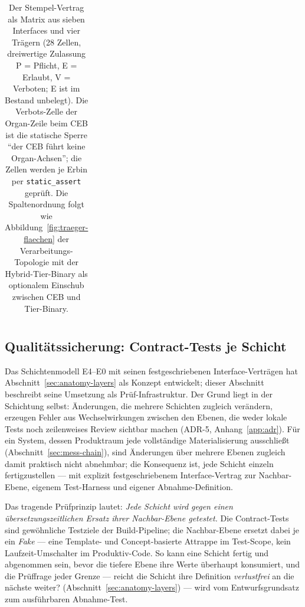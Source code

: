 \begin{nurkurz}
\begin{table}[htbp]
\begin{tabular}{@{}llcccc@{}}
\bottomrule
\end{tabular}
\caption{Der Stempel-Vertrag als Matrix aus sieben Interfaces und vier Trägern (28 Zellen, dreiwertige
Zulassung P = Pflicht, E = Erlaubt, V = Verboten; E ist im Bestand unbelegt). Die Verbots-Zelle der
Organ-Zeile beim CEB ist die statische Sperre \enquote{der CEB führt keine Organ-Achsen}; die Zellen
werden je Erbin per \texttt{static\_assert} geprüft. Die Spaltenordnung folgt wie
Abbildung~\ref{fig:traeger-flaechen} der Verarbeitungs-Topologie mit der Hybrid-Tier-Binary als
optionalem Einschub zwischen CEB und Tier-Binary.}\label{tab:stempel-matrix}
\end{table}
\end{nurkurz}

\begin{nurlang}
\section{Qualitätssicherung: Contract-Tests je Schicht}\label{sec:impl-contracts}
Das Schichtenmodell E4--E0 mit seinen festgeschriebenen Interface-Verträgen hat
Abschnitt~\ref{sec:anatomy-layers} als Konzept entwickelt; dieser Abschnitt beschreibt seine Umsetzung
als Prüf-Infrastruktur. Der Grund liegt in der Schichtung selbst: Änderungen, die mehrere Schichten
zugleich verändern, erzeugen Fehler aus Wechselwirkungen zwischen den Ebenen, die weder lokale Tests
noch zeilenweises Review sichtbar machen (ADR-5, Anhang~\ref{app:adr}). Für ein System, dessen
Produktraum jede vollständige Materialisierung ausschließt (Abschnitt~\ref{sec:mess-chain}), sind
Änderungen über mehrere Ebenen zugleich damit praktisch nicht abnehmbar; die Konsequenz ist, jede Schicht einzeln
fertigzustellen --- mit explizit festgeschriebenem Interface-Vertrag zur Nachbar-Ebene, eigenem
Test-Harness und eigener Abnahme-Definition.

Das tragende Prüfprinzip lautet: \emph{Jede Schicht wird gegen einen übersetzungszeitlichen Ersatz
ihrer Nachbar-Ebene getestet.} Die Contract-Tests sind gewöhnliche Testziele der Build-Pipeline; die
Nachbar-Ebene ersetzt dabei je ein \emph{Fake} --- eine Template- und Concept-basierte Attrappe im
Test-Scope, kein Laufzeit-Umschalter im Produktiv-Code. So kann eine Schicht fertig und abgenommen
sein, bevor die tiefere Ebene ihre Werte überhaupt konsumiert, und die Prüffrage jeder Grenze ---
reicht die Schicht ihre Definition \emph{verlustfrei} an die nächste weiter?
(Abschnitt~\ref{sec:anatomy-layers}) --- wird vom Entwurfsgrundsatz zum ausführbaren Abnahme-Test.


\end{nurlang}
